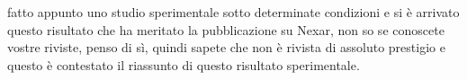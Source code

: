 {fatto appunto uno studio sperimentale sotto determinate condizioni e si è arrivato questo risultato che ha meritato la pubblicazione su Nexar, non so se conoscete vostre riviste, penso di sì, quindi sapete che non è rivista di assoluto prestigio e questo è contestato il riassunto di questo risultato sperimentale.
}